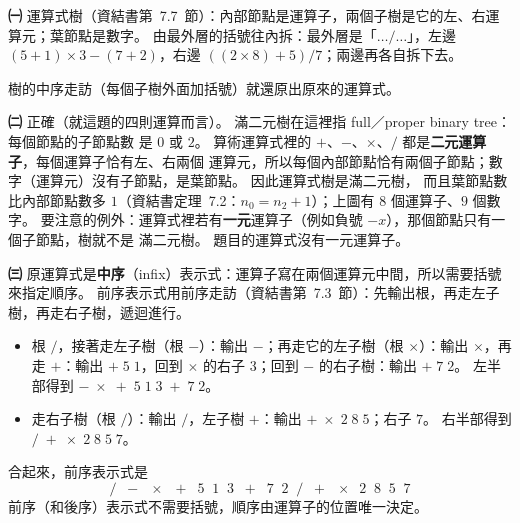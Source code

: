 \begin{pastsoln}
\textbf{㈠} 運算式樹（資結書第~7.7~節）：內部節點是運算子，兩個子樹是它的左、右運算元；葉節點是數字。
由最外層的括號往內拆：最外層是「$\ldots / \ldots$」，左邊 $(5 + 1) \times 3 - (7 + 2)$，右邊
$((2 \times 8) + 5) / 7$；兩邊再各自拆下去。
\begin{center}
\end{center}
樹的中序走訪（每個子樹外面加括號）就還原出原來的運算式。

\textbf{㈡} 正確（就這題的四則運算而言）。 滿二元樹在這裡指 full／proper binary tree：每個節點的子節點數
是 $0$ 或 $2$。 算術運算式裡的 $+$、$-$、$\times$、$/$ 都是\textbf{二元運算子}，每個運算子恰有左、右兩個
運算元，所以每個內部節點恰有兩個子節點；數字（運算元）沒有子節點，是葉節點。 因此運算式樹是滿二元樹，
而且葉節點數比內部節點數多 $1$（資結書定理~7.2：$n_0 = n_2 + 1$）；上圖有 $8$ 個運算子、$9$ 個數字。
要注意的例外：運算式裡若有\textbf{一元}運算子（例如負號 $-x$），那個節點只有一個子節點，樹就不是
滿二元樹。 題目的運算式沒有一元運算子。

\textbf{㈢} 原運算式是\textbf{中序}（infix）表示式：運算子寫在兩個運算元中間，所以需要括號來指定順序。
前序表示式用前序走訪（資結書第~7.3~節）：先輸出根，再走左子樹，再走右子樹，遞迴進行。
\begin{itemize}
\item 根 $/$，接著走左子樹（根 $-$）：輸出 $-$；再走它的左子樹（根 $\times$）：輸出 $\times$，再走 $+$：輸出
$+\; 5\; 1$，回到 $\times$ 的右子 $3$；回到 $-$ 的右子樹：輸出 $+\; 7\; 2$。 左半部得到
$-\;\times\;+\;5\;1\;3\;+\;7\;2$。
\item 走右子樹（根 $/$）：輸出 $/$，左子樹 $+$：輸出 $+\;\times\;2\;8\;5$；右子 $7$。 右半部得到
$/\;+\;\times\;2\;8\;5\;7$。
\end{itemize}
合起來，前序表示式是
\[
/ \;\; - \;\; \times \;\; + \;\; 5 \;\; 1 \;\; 3 \;\; + \;\; 7 \;\; 2 \;\; / \;\; + \;\; \times \;\; 2 \;\; 8 \;\; 5 \;\; 7
\]
前序（和後序）表示式不需要括號，順序由運算子的位置唯一決定。


\end{pastsoln}
